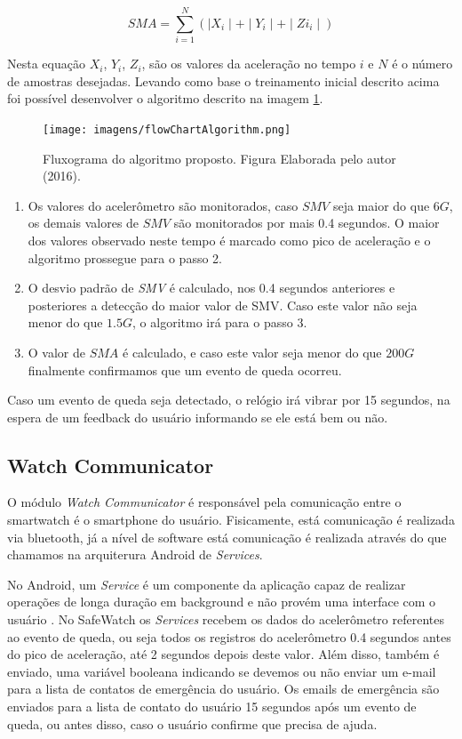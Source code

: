 \begin{equation}
SMA = \sum_{i=1}^{N} (\mid X_i\mid + \mid Y_i \mid + \mid Zi_i \mid)
\label{eq:SMA}
\end{equation}

Nesta equação $X_i$, $Y_i$, $Z_i$, são os valores da aceleração no tempo $i$ e $N$ é o número de amostras desejadas. Levando como base o treinamento inicial descrito acima foi possível desenvolver o algoritmo descrito na imagem \ref{fig:flow_chart}.

\begin{figure}[ht]
	\centering
	\texttt{[image: imagens/flowChartAlgorithm.png]}
	\caption{ Fluxograma do algoritmo proposto. Figura Elaborada pelo autor (2016).}
	\label{fig:flow_chart}
\end{figure} 

	\begin{enumerate}
		\item Os valores do acelerômetro são monitorados, caso $SMV$ seja maior do que $6G$, os demais valores de $SMV$ são monitorados por mais 0.4 segundos. O maior dos valores observado neste tempo é marcado como pico de aceleração e o algoritmo prossegue para o passo 2.
		\item O desvio padrão de \textit{SMV} é calculado, nos 0.4 segundos anteriores e posteriores a detecção do maior valor de SMV. Caso este valor não seja menor do que $1.5G$,  o algoritmo irá para o passo 3.
		\item O valor de $SMA$ é calculado, e caso este valor seja menor do que $ 200G $ finalmente confirmamos que um evento de queda ocorreu.
	\end{enumerate}

 Caso um evento de queda seja detectado, o relógio irá vibrar por 15 segundos, na espera de um feedback do usuário informando se ele está bem ou não. 

\subsection{Watch Communicator}
O módulo \textit{Watch Communicator} é responsável pela comunicação entre o smartwatch é o smartphone do usuário. Fisicamente, está comunicação é realizada via bluetooth, já a nível de software está comunicação é realizada através do que chamamos na arquiterura Android de \textit{Services}.

No Android, um \textit{Service} é um componente da aplicação capaz de realizar operações de longa duração em background e não provém uma interface com o usuário \cite{servicesAndroidDocs}. No SafeWatch os \textit{Services} recebem os dados do acelerômetro referentes ao evento de queda, ou seja todos os registros do acelerômetro 0.4 segundos antes do pico de aceleração, até 2 segundos depois deste valor. Além disso, também é enviado, uma variável booleana indicando se devemos ou não enviar um e-mail para a lista de contatos de emergência do usuário. Os emails de emergência são enviados para a lista de contato do usuário 15 segundos após um evento de queda, ou antes disso, caso o usuário confirme que precisa de ajuda. 


